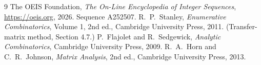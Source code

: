 \documentclass[11pt,a4paper]{article}
\theoremstyle{plain}
\theoremstyle{definition}
\begin{document}
\begin{thebibliography}{9}
 The OEIS Foundation, \emph{The On-Line Encyclopedia of Integer
Sequences}, \url{https://oeis.org}, 2026. Sequence A252507.
 R.~P.~Stanley, \emph{Enumerative Combinatorics}, Volume 1, 2nd ed.,
Cambridge University Press, 2011. (Transfer-matrix method, Section 4.7.)
 P.~Flajolet and R.~Sedgewick, \emph{Analytic Combinatorics}, Cambridge
University Press, 2009.
 R.~A.~Horn and C.~R.~Johnson, \emph{Matrix Analysis}, 2nd ed., Cambridge
University Press, 2013.
\end{thebibliography}
\end{document}
